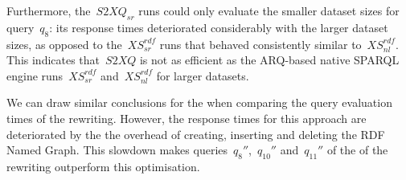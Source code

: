 Furthermore, the~$\mathit{S2XQ_{sr}}$ runs could only evaluate the smaller dataset sizes for query~$q_{8}$: its response
times deteriorated considerably with the larger dataset sizes, as opposed to the~$\mathit{XS^{rdf}_{sr}}$ runs that
behaved consistently similar to~$\mathit{XS^{rdf}_{nl}}$.  This indicates that~$\mathit{S2XQ}$ is not as efficient as
the ARQ-based native SPARQL engine runs~$\mathit{XS^{rdf}_{sr}}$ and~$\mathit{XS^{rdf}_{nl}}$ for larger datasets.


We can draw similar conclusions for the  when comparing the query evaluation times of the
 rewriting.  However, the response times for this approach are deteriorated by the the overhead of
creating, inserting and deleting the \ac{RDF} Named Graph.  This slowdown makes queries~$q_8''$,~$q_{10}''$ and~$q_{11}''$ of
the of the  rewriting outperform this optimisation.



